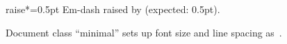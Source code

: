 \documentclass{minimal}
\newcommand*{\raiseamount}{0.5pt}
\begin{document}
\begin{typogsetup}{raise*=\raiseamount}
  Em-dash raised by \the{} (expected: \raiseamount).
\end{typogsetup}

Document class ``minimal'' sets up font size and line spacing as~\typoinfo.
\end{document}
